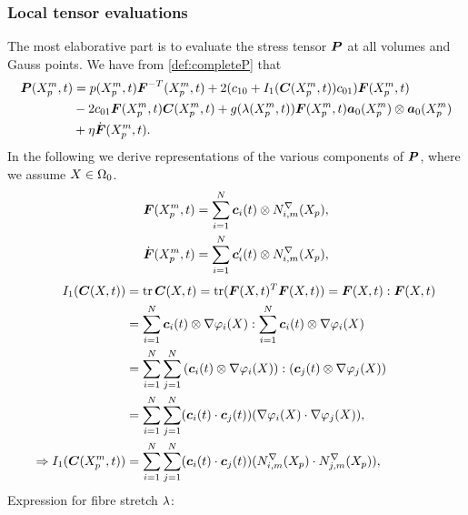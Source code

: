 \subsubsection{Local tensor evaluations}
The most elaborative part is to evaluate the stress tensor $\vP$ at all volumes and Gauss points.
We have from \eqref{def:completeP} that
\begin{align*}
		\vP(\pmp,t) &= p(\pmp,t)\vF^{-T}(\pmp,t) + 2(c_{10} + I_1(\vC(\pmp,t))c_{01})\vF(\pmp,t)\\
			 &- 2c_{01}\vF(\pmp,t)\vC(\pmp,t)+g(\la(\pmp,t))\vF(\pmp,t)\va_0(\pmp)\otimes\va_0(\pmp)\\
			 & + \eta \dot{\vF}(\pmp,t).
\end{align*}
In the following we derive representations of the various components of $\vP$, where we assume $X\in\Or$.
\begin{align*}
	\vF(\pmp,t) &= \sumi \vc_i(t)\otimes \dNimp,\\
	\dot{\vF}(\pmp,t) &= \sumi \vc_i'(t)\otimes \dNimp,
\end{align*}	
\begin{align}
	I_1(\vC(X,t)) &= \tr\vC(X,t) = \tr(\vF(X,t)^T\vF(X,t)) = \vF(X,t) : \vF(X,t)\nonumber\\
	&= \sumi \vc_i(t)\otimes \dpi : \sumi \vc_i(t)\otimes \dpi\nonumber\\
	&= \sumi\sumj \left(\vc_i(t)\otimes \dpi\right) : (\vc_j(t)\otimes \dpj)\nonumber\\
	&= \sumi\sumj (\vc_i(t) \cdot \vc_j(t))(\dpi \cdot \dpj),\label{eq:I1_basis}\\
	\Rightarrow I_1(\vC(\pmp,t)) &= \sumi\sumj (\vc_i(t) \cdot \vc_j(t))(\dNimp \cdot \dNjmp),\nonumber
\end{align}
Expression for fibre stretch $\la$:
